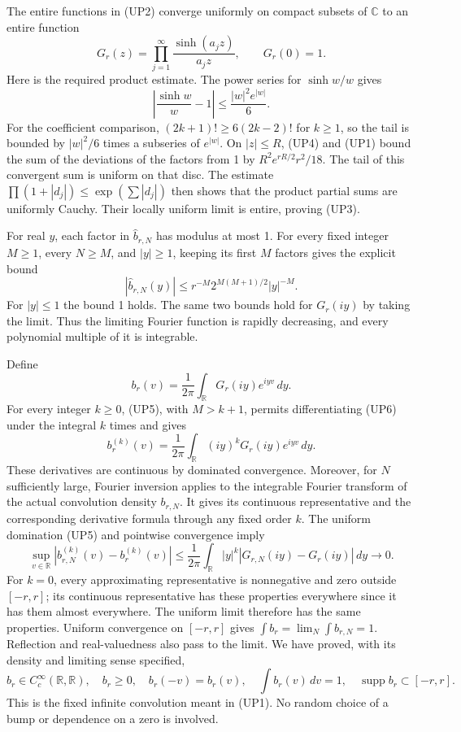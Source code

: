 \documentclass[
  10pt,
  a4paper,
]{article}
\begin{document}
The entire functions in (UP2) converge uniformly on compact subsets of
\(\mathbb C\) to an entire function \[
G_r(z)=\prod_{j=1}^\infty\frac{\sinh(a_jz)}{a_jz},
\qquad G_r(0)=1.
\tag{UP3}
\] Here is the required product estimate. The power series for
\(\sinh w/w\) gives \[
\left|\frac{\sinh w}{w}-1\right|
\le\frac{|w|^2e^{|w|}}6.
\tag{UP4}
\] For the coefficient comparison, \((2k+1)!\ge6(2k-2)!\) for \(k\ge1\),
so the tail is bounded by \(|w|^2/6\) times a subseries of \(e^{|w|}\).
On \(|z|\le R\), (UP4) and (UP1) bound the sum of the deviations of the
factors from 1 by \(R^2e^{rR/2}r^2/18\). The tail of this convergent sum
is uniform on that disc. The estimate
\(\prod(1+|d_j|)\le\exp(\sum|d_j|)\) then shows that the product partial
sums are uniformly Cauchy. Their locally uniform limit is entire,
proving (UP3).

For real \(y\), each factor in \(\widehat b_{r,N}\) has modulus at most
1. For every fixed integer \(M\ge1\), every \(N\ge M\), and \(|y|\ge1\),
keeping its first \(M\) factors gives the explicit bound \[
|\widehat b_{r,N}(y)|
\le r^{-M}2^{M(M+1)/2}|y|^{-M}.
\tag{UP5}
\] For \(|y|\le1\) the bound 1 holds. The same two bounds hold for
\(G_r(iy)\) by taking the limit. Thus the limiting Fourier function is
rapidly decreasing, and every polynomial multiple of it is integrable.

Define \[
b_r(v)=\frac1{2\pi}\int_{\mathbb R}G_r(iy)e^{iyv}\,dy.
\tag{UP6}
\] For every integer \(k\ge0\), (UP5), with \(M>k+1\), permits
differentiating (UP6) under the integral \(k\) times and gives \[
b_r^{(k)}(v)=\frac1{2\pi}\int_{\mathbb R}(iy)^kG_r(iy)e^{iyv}\,dy.
\tag{UP7}
\] These derivatives are continuous by dominated convergence. Moreover,
for \(N\) sufficiently large, Fourier inversion applies to the
integrable Fourier transform of the actual convolution density
\(b_{r,N}\). It gives its continuous representative and the
corresponding derivative formula through any fixed order \(k\). The
uniform domination (UP5) and pointwise convergence imply \[
\sup_{v\in\mathbb R}|b_{r,N}^{(k)}(v)-b_r^{(k)}(v)|
\le\frac1{2\pi}\int_{\mathbb R}|y|^k
|G_{r,N}(iy)-G_r(iy)|\,dy\longrightarrow0.
\tag{UP8}
\] For \(k=0\), every approximating representative is nonnegative and
zero outside \([-r,r]\); its continuous representative has these
properties everywhere since it has them almost everywhere. The uniform
limit therefore has the same properties. Uniform convergence on
\([-r,r]\) gives \(\int b_r=\lim_N\int b_{r,N}=1\). Reflection and
real-valuedness also pass to the limit. We have proved, with its density
and limiting sense specified, \[
b_r\in C_c^\infty(\mathbb R,\mathbb R),\quad b_r\ge0,\quad
b_r(-v)=b_r(v),\quad \int b_r(v)\,dv=1,\quad
\operatorname{supp}b_r\subset[-r,r].
\tag{UP9}
\] This is the fixed infinite convolution meant in (UP1). No random
choice of a bump or dependence on a zero is involved.
\end{document}
